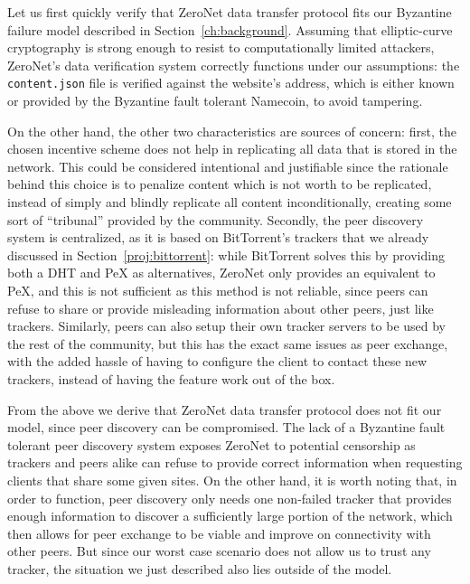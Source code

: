 \documentclass[mscthesis]{usiinfthesis}
\begin{document}
Let us first quickly verify that ZeroNet data transfer protocol fits our Byzantine failure model described in Section~\ref{ch:background}. Assuming that elliptic-curve cryptography is strong enough to resist to computationally limited attackers, ZeroNet's data verification system correctly functions under our assumptions: the \texttt{content.json} file is verified against the website's address, which is either known or provided by the Byzantine fault tolerant Namecoin, to avoid tampering.

On the other hand, the other two characteristics are sources of concern: first, the chosen incentive scheme does not help in replicating all data that is stored in the network. This could be considered intentional and justifiable since the rationale behind this choice is to penalize content which is not worth to be replicated, instead of simply and blindly replicate all content inconditionally, creating some sort of ``tribunal'' provided by the community. Secondly, the peer discovery system is centralized, as it is based on BitTorrent's trackers that we already discussed in Section~\ref{proj:bittorrent}: while BitTorrent solves this by providing both a DHT and PeX as alternatives, ZeroNet only provides an equivalent to PeX, and this is not sufficient as this method is not reliable, since peers can refuse to share or provide misleading information about other peers, just like trackers. Similarly, peers can also setup their own tracker servers to be used by the rest of the community, but this has the exact same issues as peer exchange, with the added hassle of having to configure the client to contact these new trackers, instead of having the feature work out of the box.

From the above we derive that ZeroNet data transfer protocol does not fit our model, %
since peer discovery can be compromised. The lack of a Byzantine fault tolerant peer discovery system exposes ZeroNet to potential censorship as trackers and peers alike can refuse to provide correct information when requesting clients that share some given sites. On the other hand, it is worth noting that, in order to function, peer discovery only needs one non-failed tracker that provides enough information to discover a sufficiently large portion of the network, which then allows for peer exchange to be viable and improve on connectivity with other peers. But since our worst case scenario does not allow us to trust any tracker, the situation we just described also lies outside of the model.
\end{document}

